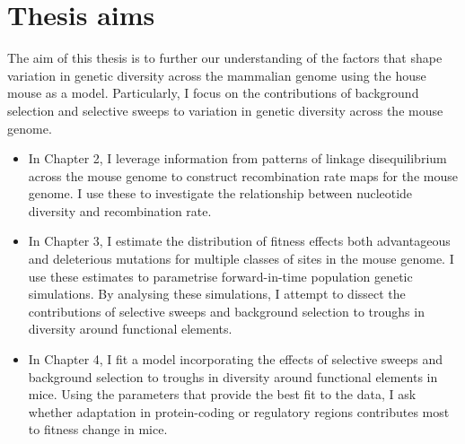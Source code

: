 \section[Thesis aims]{Thesis aims}

	The aim of this thesis is to further our understanding of the factors that shape variation in genetic diversity across the mammalian genome using the house mouse as a model. Particularly, I focus on the contributions of background selection and selective sweeps to variation in genetic diversity across the mouse genome. 

	\begin{itemize}
	
	\item In Chapter 2, I leverage information from patterns of linkage disequilibrium across the mouse genome to construct recombination rate maps for the mouse genome. I use these to investigate the relationship between nucleotide diversity and recombination rate. 
	
	\item In Chapter 3, I estimate the distribution of fitness effects both advantageous and deleterious mutations for multiple classes of sites in the mouse genome. I use these estimates to parametrise forward-in-time population genetic simulations. By analysing these simulations, I attempt to dissect the contributions of selective sweeps and background selection to troughs in diversity around functional elements.
	
	\item In Chapter 4, I fit a model incorporating the effects of selective sweeps and background selection to troughs in diversity around functional elements in mice. Using the parameters that provide the best fit to the data, I ask whether adaptation in protein-coding or  regulatory regions contributes most to fitness change in mice.
	
	\end{itemize}

